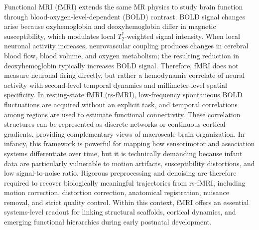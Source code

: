 Functional MRI (fMRI) extends the same MR physics to study brain function through blood-oxygen-level-dependent (BOLD) contrast. BOLD signal changes arise because oxyhemoglobin and deoxyhemoglobin differ in magnetic susceptibility, which modulates local \(T_2^*\)-weighted signal intensity. When local neuronal activity increases, neurovascular coupling produces changes in cerebral blood flow, blood volume, and oxygen metabolism; the resulting reduction in deoxyhemoglobin typically increases BOLD signal. Therefore, fMRI does not measure neuronal firing directly, but rather a hemodynamic correlate of neural activity with second-level temporal dynamics and millimeter-level spatial specificity\cite{westbrookMRIPractice6th}. In resting-state fMRI (rs-fMRI), low-frequency spontaneous BOLD fluctuations are acquired without an explicit task, and temporal correlations among regions are used to estimate functional connectivity. These correlation structures can be represented as discrete networks or continuous cortical gradients, providing complementary views of macroscale brain organization. In infancy, this framework is powerful for mapping how sensorimotor and association systems differentiate over time, but it is technically demanding because infant data are particularly vulnerable to motion artifacts, susceptibility distortions, and low signal-to-noise ratio. Rigorous preprocessing and denoising are therefore required to recover biologically meaningful trajectories from rs-fMRI, including motion correction, distortion correction, anatomical registration, nuisance removal, and strict quality control. Within this context, fMRI offers an essential systems-level readout for linking structural scaffolds, cortical dynamics, and emerging functional hierarchies during early postnatal development\cite{westbrookMRIPractice6th}.

